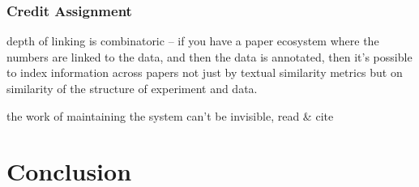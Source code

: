 \documentclass[10pt]{article}
\begin{document}
\begin{multicols}{2}
{\subsubsection{Credit Assignment}\label{credit-assignment}}

depth of linking is combinatoric -- if you have a paper ecosystem where
the numbers are linked to the data, and then the data is annotated, then
it's possible to index information across papers not just by textual
similarity metrics but on similarity of the structure of experiment and
data.

the work of maintaining the system can't be invisible, read \& cite \cite{classeDistributedInfrastructureSupport2017, bowkerInformationInfrastructureStudies2010}  
\end{multicols}


\hypertarget{conclusion}{%
\section{Conclusion}\label{conclusion}}
\end{document}
